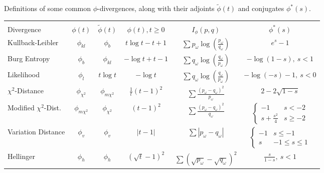 \documentclass[ijoc,letterpaper]{informs3} %
\begin{document}
\begin{table}
	\TABLE
	{
		Definitions of some common $\phi$-divergences, along with their adjoints $\tilde{\phi}(t)$ and conjugates $\phi^*(s)$.
		\label{tb:phi_definitions}
	}
	{\begin{tabular}{lccccc}
		\hline \\
		Divergence                        & $\phi(t)$          & $\tilde{\phi}(t)$               & $\phi(t), t \geq 0$   & $I_\phi(p,q)$     & $\phi^*(s)$ \\
		\hline
		Kullback-Leibler                  & $\phi_{kl}$        & $\phi_b$                        & $t\log t - t + 1$     & $\sum p_\omega \log\left(\frac{p_\omega}{q_\omega}\right)$ & $e^s - 1$ \\
		Burg Entropy                      & $\phi_b$           & $\phi_{kl}$                     & $-\log t + t - 1$     & $\sum q_\omega \log\left(\frac{q_\omega}{p_\omega}\right)$ & $-\log(1-s),\ s < 1$  \\
		Likelihood                        & $\phi_l$           & $t\log t $                      & $-\log t$             & $\sum q_\omega \log\left(\frac{q_\omega}{p_\omega}\right)$ & $-\log(-s) - 1,\ s < 0$ \\
		$\chi^2$-Distance                 & $\phi_{\chi^2}$    & $\phi_{m\chi^2}$                & $\frac{1}{t} (t-1)^2$ & $\sum \frac{(p_\omega-q_\omega)^2}{p_\omega}$              & $2 - 2\sqrt{1-s}$  \\
		Modified $\chi^2$-Dist.           & $\phi_{m\chi^2}$   & $\phi_{\chi^2}$                 & $(t-1)^2$             & $\sum \frac{(p_\omega - q_\omega)^2}{q_\omega}$            & $\begin{cases} -1 & s < -2 \\ s + \frac{s^2}{4} & s \geq -2 \end{cases}$ \\
		Variation Distance                & $\phi_v$           & $\phi_v$                        & $|t-1|$               & $\sum |p_\omega - q_\omega|$                               & $\begin{cases} -1 & s \leq -1 \\ s & -1 \leq s \leq 1 \end{cases}$ \\
		Hellinger                         & $\phi_h$           & $\phi_h$                        & $(\sqrt{t} - 1)^2$    & $\sum (\sqrt{p_\omega} - \sqrt{q_\omega})^2$               & $\frac{s}{1-s},\ s < 1$ \\
	\hline
	\end{tabular}}
	{}
\end{table}
\end{document}

